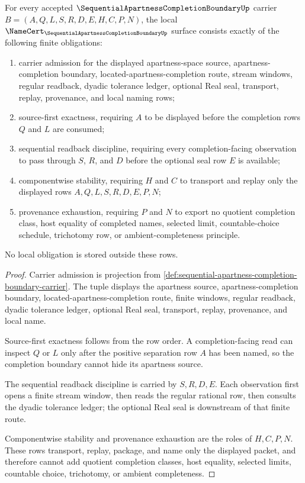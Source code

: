 \begin{theorem}
\label{thm:sequential-apartness-completion-boundary-namecert-obligations}
For every accepted $\SequentialApartnessCompletionBoundaryUp$ carrier $B=(A,Q,L,S,R,D,E,H,C,P,N)$, the local $\NameCert_{\SequentialApartnessCompletionBoundaryUp}$ surface consists exactly of the following finite obligations:
\begin{enumerate}
\item carrier admission for the displayed apartness-space source, apartness-completion boundary, located-apartness-completion route, stream windows, regular readback, dyadic tolerance ledger, optional Real seal, transport, replay, provenance, and local naming rows;
\item source-first exactness, requiring $A$ to be displayed before the completion rows $Q$ and $L$ are consumed;
\item sequential readback discipline, requiring every completion-facing observation to pass through $S$, $R$, and $D$ before the optional seal row $E$ is available;
\item componentwise stability, requiring $H$ and $C$ to transport and replay only the displayed rows $A,Q,L,S,R,D,E,P,N$;
\item provenance exhaustion, requiring $P$ and $N$ to export no quotient completion class, host equality of completed names, selected limit, countable-choice schedule, trichotomy row, or ambient-completeness principle.
\end{enumerate}
No local obligation is stored outside these rows.
\end{theorem}
\begin{proof}
Carrier admission is projection from \autoref{def:sequential-apartness-completion-boundary-carrier}. The tuple displays the apartness source, apartness-completion boundary, located-apartness-completion route, finite windows, regular readback, dyadic tolerance ledger, optional Real seal, transport, replay, provenance, and local name.

Source-first exactness follows from the row order. A completion-facing read can inspect $Q$ or $L$ only after the positive separation row $A$ has been named, so the completion boundary cannot hide its apartness source.

The sequential readback discipline is carried by $S,R,D,E$. Each observation first opens a finite stream window, then reads the regular rational row, then consults the dyadic tolerance ledger; the optional Real seal is downstream of that finite route.

Componentwise stability and provenance exhaustion are the roles of $H,C,P,N$. These rows transport, replay, package, and name only the displayed packet, and therefore cannot add quotient completion classes, host equality, selected limits, countable choice, trichotomy, or ambient completeness.
\end{proof}

